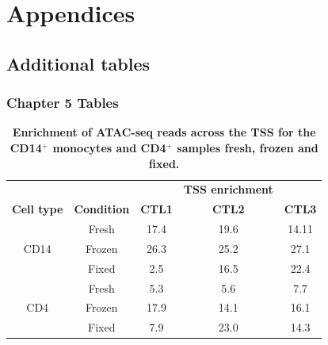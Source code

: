 \appendix
{}
\startcontents
{}
\begingroup
\let\clearpage\relax
\singlespacing
{}
\endgroup

\chapter{Appendices}
\label{app:Appendix}

\section{Additional tables}

\subsection{Chapter 5 Tables}

\begin{table}[htbp]
\centering
\begin{tabular}{@{} c c c c c}
\toprule
                   &                    &               & \textbf{TSS enrichment} &     \\
\textbf{Cell type} & \textbf{Condition} & \textbf{CTL1} & \textbf{CTL2} & \textbf{CTL3} \\
\midrule
\midrule
      & Fresh	 & 17.4 & 19.6 & 14.11\\
CD14	& Frozen & 26.3 & 25.2 & 27.1 \\
      & Fixed	 & 2.5  & 16.5 & 22.4 \\
\midrule
      & Fresh	 & 5.3  & 5.6  & 7.7 \\
CD4	  & Frozen & 17.9 & 14.1 & 16.1 \\
      & Fixed	 & 7.9  & 23.0 & 14.3 \\
\bottomrule
\end{tabular}
\medskip %
\caption[Enrichment of ATAC-seq reads across the TSS for the CD14$^+$ monocytes and CD4$^+$ samples fresh, frozen and fixed.]{\textbf{Enrichment of ATAC-seq reads across the TSS for the CD14$^+$ monocytes and CD4$^+$ samples fresh, frozen and fixed.}}
\label{tab:Core_ATAC_TSS_summary_table}
\end{table}
\bigskip %






